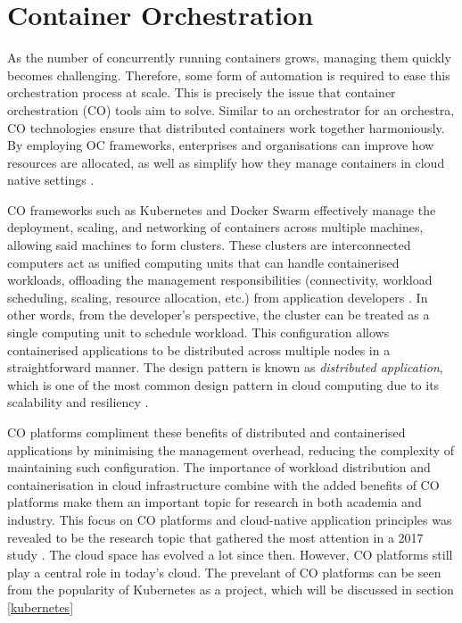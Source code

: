 \section{Container Orchestration}

As the number of concurrently running containers grows, managing them quickly becomes challenging. Therefore, some form of automation is required to ease this orchestration process at scale. This is precisely the issue that container orchestration (CO) tools aim to solve. Similar to an orchestrator for an orchestra, CO technologies ensure that distributed containers work together harmoniously. By employing OC frameworks, enterprises and organisations can improve how resources are allocated, as well as simplify how they manage containers in cloud native settings \cite{truyenComprehensiveFeatureComparison2019}.

CO frameworks such as Kubernetes and Docker Swarm effectively manage the deployment, scaling, and networking of containers across multiple machines, allowing said machines to form clusters. These clusters are interconnected computers act as unified computing units that can handle containerised workloads, offloading the management responsibilities (connectivity, workload scheduling, scaling, resource allocation, etc.) from application developers \cite{Nodes, UsingMinikubeCreate}. In other words, from the developer's perspective, the cluster can be treated as a single computing unit to schedule workload. This configuration allows containerised applications to be distributed across multiple nodes in a straightforward manner. The design pattern is known as \textit{distributed application}, which is one of the most common design pattern in cloud computing due to its scalability and resiliency \cite{fehling2014cloud,kratzkeUnderstandingCloudnativeApplications2017}.

CO platforms compliment these benefits of distributed and containerised applications by minimising the management overhead, reducing the complexity of maintaining such configuration. The importance of workload distribution and containerisation in cloud infrastructure combine with the added benefits of CO platforms make them an important topic for research in both academia and industry. This focus on CO platforms and cloud-native application principles was revealed to be the research topic that gathered the most attention in a 2017 study \cite{kratzkeUnderstandingCloudnativeApplications2017}. The cloud space has evolved a lot since then. However, CO platforms still play a central role in today's cloud. The prevelant of CO platforms can be seen from the popularity of Kubernetes as a project, which will be discussed in section \ref{kubernetes}


